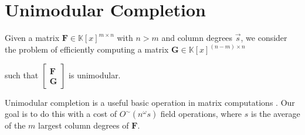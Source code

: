 
\chapter{\label{chap:Unimodular-Completion}Unimodular Completion}

Given a matrix $\mathbf{F}\in\mathbb{K}\left[x\right]^{m\times n}$
with $n>m$ and column degrees $\vec{s}$, we consider the problem
of efficiently computing a matrix $\mathbf{G}\in\mathbb{K}\left[x\right]^{(n-m)\times n}$
\begin{comment}
with $\left(-\vec{s}\right)$-minimal rows 
\end{comment}
such that $\begin{bmatrix}\mathbf{F}\\
\mathbf{G}
\end{bmatrix}$ is unimodular.%
\begin{comment}
let us call the product of the nonzero entries of its smith normal
form the \emph{generalized determinant} of $\mathbf{F}$.

Suppose $\mathbf{F}$ is full-rank with column degrees bounded by
the entries of a shift $\vec{s}\in\mathbb{Z}_{\ge0}^{n}$. We consider
the problem of finding a matrix $\mathbf{G}\in\mathbb{K}\left[x\right]^{(n-m)\times n}$
with $\left(-\vec{s}\right)$-minimal rows such that $\left[\mathbf{F}^{T},\mathbf{G}^{T}\right]^{T}$
has the same determinant as the generalized determinant of $\mathbf{F}$.
In the special case where the generalized determinant of $\mathbf{F}$
is $1$, the problem specializes to the standard unimodular completion
problem, where $\left[\mathbf{F}^{T},\mathbf{G}^{T}\right]^{T}$ is
unimodular. Note that the $\left(-\vec{s}\right)$ shift is chosen
to make the degrees consistent with the degrees of the input matrix
$\mathbf{F}$.
\begin{example}
If $\mathbf{F}=\left[1,0\right]$, $\vec{s}=\left[0,0\right]$. Then
the generalized determinant of $\mathbf{F}$ is $1$. A $\left(-\vec{s}\right)$-minimal
unimodular completion of $\mathbf{F}$ is then $\mathbf{G}=\left[0,1\right]$.
A unimodular completion that is not minimal is $\left[x^{9},1\right]$.
If $\mathbf{F}=\left[x,x^{2}\right]$, then a $\left(-\vec{s}\right)$-minimal
completion that maintains the generalized determinant is again $\left[0,1\right]$.\end{example}
\end{comment}
{} Unimodular completion is a useful basic operation in matrix computations
\citep{newman1972}. Our goal is to do this with a cost of $O^{\sim}\left(n^{\omega}s\right)$
field operations, where $s$ is the average of the $m$ largest column
degrees of $\mathbf{F}$.

